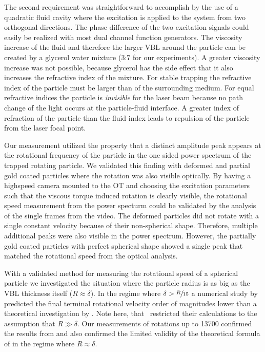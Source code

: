 The second requirement was straightforward to accomplish by the use of a 
quadratic fluid cavity where the excitation is applied to the system from two 
orthogonal directions. The phase difference of the two excitation signals could 
easily be realized with most dual channel function generators. The viscosity 
increase of the fluid and therefore the larger VBL around the particle can be 
created by a glycerol water mixture (3:7 for our experiments). A greater 
viscosity increase was not possible, because glycerol has the side effect that 
it also increases the refractive index of the mixture. For stable trapping the 
refractive index of the particle must be larger than of the surrounding medium. 
For equal refractive indices the particle is \emph{invisible} for the laser 
beam because no path change of the light occurs at the particle-fluid 
interface. A greater index of refraction of the particle than the fluid index 
leads to repulsion of the particle from the laser focal point.

Our measurement utilized the property that a distinct amplitude peak appears at 
the rotational frequency of the particle in the one sided power spectrum of the 
trapped rotating particle. We validated this finding with deformed and partial 
gold coated particles where the rotation was also visible optically. By having 
a highspeed camera mounted to the OT and choosing the excitation parameters 
such that the viscous torque induced rotation is clearly visible, the 
rotational speed measurement from the power specturm could be validated by the 
analysis of the single frames from the video. The deformed particles did not 
rotate with a single constant velocity because of their non-spherical shape. 
Therefore, multiple additional peaks were also visible in the power spectrum.  
However, the partially gold coated particles with perfect spherical shape 
showed a single peak that matched the rotational speed from the optical 
analysis.

With a validated method for measuring the rotational speed of a spherical 
particle we investigated the situation where the particle radius is as big as 
the VBL thickness itself ($R\approx\delta$). In the regime where $\delta > 
\sfrac{R}{15}$ a numerical study by  predicted the final 
terminal rotational velocity order of magnitudes lower than a theoretical 
investigation by . Note here, that~ 
restricted their calculations to the assumption that $R\gg\delta$. Our 
measurements of rotations up to \SI{13700}{\rpm} confirmed the results from 
 and also confirmed the limited validity of the theoretical 
formula of  in the regime where $R\approx\delta$.

